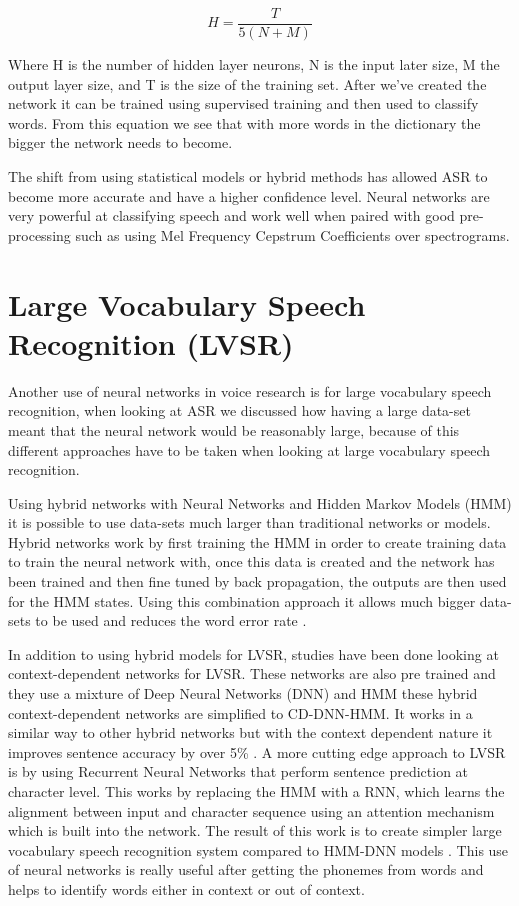 \documentclass[11pt]{article}
\begin{document}
    \begin{equation}
    H = \frac{T}{5(N+M)}
    \end{equation}
    
    Where H is the number of hidden layer neurons, N is the input later size, M the output layer size, and T is the size of the training set. After we've created the network it can be trained using supervised training and then used to classify words. From this equation we see that with more words in the dictionary the bigger the network needs to become.
    
    The shift from using statistical models or hybrid methods has allowed ASR to become more accurate and have a higher confidence level. Neural networks are very powerful at classifying speech and work well when paired with good pre-processing such as using Mel Frequency Cepstrum Coefficients over spectrograms.
    

    \section{Large Vocabulary Speech Recognition (LVSR)}
    Another use of neural networks in voice research is for large vocabulary speech recognition, when looking at ASR we discussed how having a large data-set meant that the neural network would be reasonably large, because of this different approaches have to be taken when looking at large vocabulary speech recognition.
    
    Using hybrid networks with Neural Networks and Hidden Markov Models (HMM) it is possible to use data-sets much larger than traditional networks or models. Hybrid networks work by first training the HMM in order to create training data to train the neural network with, once this data is created and the network has been trained and then fine tuned by back propagation, the outputs are then used for the HMM states. Using this combination approach it allows much bigger data-sets to be used and reduces the word error rate \cite{JaitlyApplicationRecognition}.
    
    In addition to using hybrid models for LVSR, studies have been done looking at context-dependent networks for LVSR. These networks are also pre trained and they use a mixture of Deep Neural Networks (DNN) and HMM these hybrid context-dependent networks are simplified to CD-DNN-HMM. It works in a similar way to other hybrid networks but with the context dependent nature it improves sentence accuracy by over 5\% \cite{Dahl2012Context-dependentRecognition}. A more cutting edge approach to LVSR is by using Recurrent Neural Networks that perform sentence prediction at character level. This works by replacing the HMM with a RNN, which learns the alignment between input and character sequence using an attention mechanism which is built into the network. The result of this work is to create simpler large vocabulary speech recognition system compared to HMM-DNN models \cite{Bahdanau2016End-to-endRecognition}. This use of neural networks is really useful after getting the phonemes from words and helps to identify words either in context or out of context. 
    
\end{document}

